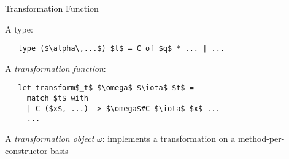 \documentclass{beamer}
\theoremstyle{definition}
\theoremstyle{plain} %
\begin{document}

\begin{comment}
  For given algebraic datatype $t$ we can define a single transformation function \lstinline|transform$_t$|. This
  function takes three arguments; two last ones are an inherited attribute and a subject (the data structure of type $t$). The first
  one is a \emph{transformation object}. This object represents the essense of the transformation on a method-per-constructor
  basis. The transformation function performs a pattern-matching on the subject and dispatched the control to the corresponding
  methods, passing as their arguments the matched sub-values and the inherited attribute. Note, the transformation function
  is not recursive, it performs a shallow traversal.
\end{comment}

\begin{frame}[fragile]{Transformation Function}

  A type:
  
\begin{lstlisting}
   type ($\alpha\,...$) $t$ = C of $q$ * ... | ...
\end{lstlisting}
\vskip5mm

A \emph{transformation function}:

\begin{lstlisting}
   let transform$_t$ $\omega$ $\iota$ $t$ =
     match $t$ with
     | C ($x$, ...) -> $\omega$#C $\iota$ $x$ ...
     ...
\end{lstlisting}
\vskip5mm

A \emph{transformation object} $\omega$: implements a transformation on a method-per-constructor basis
\vskip5mm
\end{frame}


\begin{comment}
  Transformation objects potentially can be constructed in any way one would prefer; however, we provide a common
  base abstract class for all transformation objects (or classes). As it implements the transformation of the shape we
  dealt with on the slide 3, the transformation class is highly polymorphic~--- it has $3*n+2$ type parameters (where
  $n$ is the arity of the type (plus one extra parameter for polymorphic variants). The signatures of methods are
  expressed in terms of the class' type parameters and types of arguments for corresponding constructor. 
\end{comment}
\end{document}
